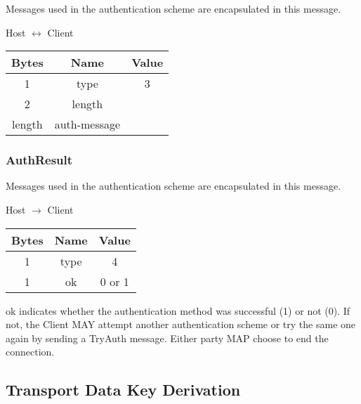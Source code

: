 Messages used in the authentication scheme are encapsulated in this message.

\begin{center}
    Host $\leftrightarrow$ Client\\
    \begin{tabular}{|c|c|c|}
        \hline
        \textbf{Bytes} & \textbf{Name} & \textbf{Value} \\
        \hline
        1              & type          & 3              \\
        \hline
        2              & length        &                \\
        \hline
        length         & auth-message  &                \\
        \hline
    \end{tabular}
\end{center}

\subsubsection{AuthResult}

Messages used in the authentication scheme are encapsulated in this message.

\begin{center}
    Host $\rightarrow$ Client\\
    \begin{tabular}{|c|c|c|}
        \hline
        \textbf{Bytes} & \textbf{Name} & \textbf{Value} \\
        \hline
        1              & type          & 4              \\
        \hline
        1              & ok            & 0 or 1         \\
        \hline
    \end{tabular}
\end{center}

ok indicates whether the authentication method was successful (1) or not (0). If not, the Client MAY attempt another authentication scheme or try the same one again by sending a TryAuth message. Either party MAP choose to end the connection.

\subsection{Transport Data Key Derivation}

